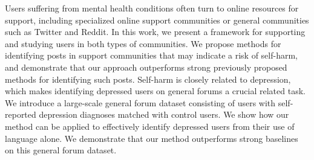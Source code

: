 Users suffering from mental health conditions often turn to online resources for support, including specialized online support communities or general communities such as Twitter and Reddit. In this work, we present a framework for supporting and studying users in both types of communities. We propose methods for identifying posts in support communities that may indicate a risk of self-harm, and demonstrate that our approach outperforms strong previously proposed methods for identifying such posts. Self-harm is closely related to depression, which makes identifying depressed users on general forums a crucial related task. We introduce a large-scale general forum dataset consisting of users with self-reported depression diagnoses matched with control users. We show how our method can be applied to effectively identify depressed users from their use of language alone. We demonstrate that our method outperforms strong baselines on this general forum dataset.
